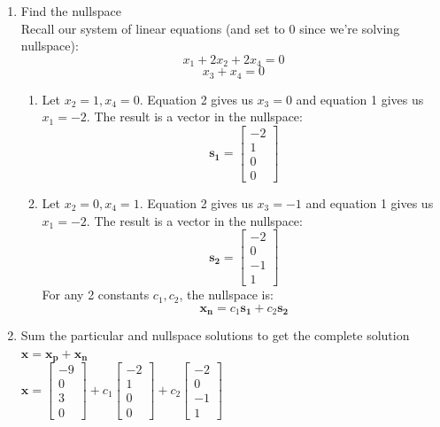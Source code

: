 \documentclass[11pt]{article}
\begin{document}
\begin{enumerate}
    \item Find the nullspace \\

    Recall our system of linear equations (and set to 0 since we're solving nullspace):
    \[x_1 + 2x_2 + 2x_4 = 0 \]
    \[x_3 + x_4 = 0 \]

    \begin{enumerate}
        \item Let $x_2 = 1, x_4 = 0$. Equation 2 gives us $x_3 = 0$ and equation 1 gives us 
        $x_1 = -2$. The result is a vector in the nullspace: \[ \boldsymbol{s_1} = \begin{bmatrix}
            -2 \\
            1 \\
            0 \\
            0
        \end{bmatrix}
    \]

        \item Let $x_2 = 0, x_4 = 1$. Equation 2 gives us $x_3 = -1$ and equation 1 gives us 
        $x_1 = -2$. The result is a vector in the nullspace: \[ \boldsymbol{s_2}= \begin{bmatrix}
            -2 \\
            0 \\
            -1 \\
            1
        \end{bmatrix}
    \]
    For any 2 constants $c_1, c_2$, the nullspace is: 
    \[ \boldsymbol{x_\text{n}} = c_1\boldsymbol{s_1} + c_2\boldsymbol{s_2} \]
    
    \end{enumerate}

    \item Sum the particular and nullspace solutions to get the complete solution \\
    
    $\boldsymbol{x} = \boldsymbol{x_\text{p}}+ \boldsymbol{x_\text{n}} $ \\
    
    $\boldsymbol{x} = \begin{bmatrix}
        -9 \\
        0 \\
        3 \\
        0
    \end{bmatrix} + c_1 \begin{bmatrix}
        -2 \\
        1 \\
        0 \\
        0
    \end{bmatrix} + c_2 \begin{bmatrix}
        -2 \\
        0 \\
        -1 \\
        1
    \end{bmatrix}  $
    
\end{enumerate}
    
\end{document}
